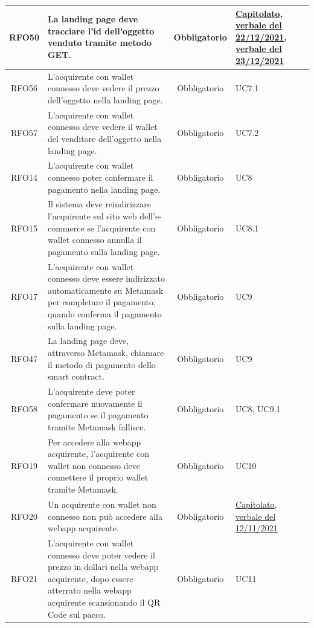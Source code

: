\documentclass[a4paper, 12pt]{article}
\begin{document}
\begin{longtable}{|c|p{7cm}|c|p{4cm}|}
\hline
RFO50 & La landing page deve tracciare l'id dell'oggetto venduto tramite metodo GET. & Obbligatorio & \underline{\href{https://www.math.unipd.it/~tullio/IS-1/2021/Progetto/C2.pdf}{Capitolato}}, \underline{\href{https://github.com/iota97/WinningSoftwareSolution/blob/main/public/esterni/verbali/2021_12_22_E.pdf}{verbale del 22/12/2021}}, \underline{\href{https://github.com/iota97/WinningSoftwareSolution/blob/main/public/interni/verbali/2021_12_23_I.pdf}{verbale del 23/12/2021}} \\
\hline
RFO56 & L'acquirente con wallet connesso deve vedere il prezzo dell'oggetto nella landing page. & Obbligatorio & UC7.1 \\
\hline
RFO57 & L'acquirente con wallet connesso deve vedere il wallet del venditore dell'oggetto nella landing page. & Obbligatorio & UC7.2 \\
\hline
RFO14 & L'acquirente con wallet connesso poter confermare il pagamento nella landing page. & Obbligatorio & UC8 \\
\hline
RFO15 & Il sistema deve reindirizzare l'acquirente sul sito web dell'e-commerce se l'acquirente con wallet connesso annulla il pagamento sulla landing page. & Obbligatorio & UC8.1 \\
\hline
RFO17 & L'acquirente con wallet connesso deve essere indirizzato automaticamente su Metamask per completare il pagamento, quando conferma il pagamento sulla landing page. & Obbligatorio & UC9 \\
\hline
RFO47 & La landing page deve, attraverso Metamask, chiamare il metodo di pagamento dello smart contract. & Obbligatorio & UC9 \\
\hline
RFO58 & L'acquirente deve poter confermare nuovamente il pagamento se il pagamento tramite Metamask fallisce. & Obbligatorio & UC8, UC9.1 \\
\hline
RFO19 & Per accedere alla webapp acquirente, l'acquirente con wallet non connesso deve connettere il proprio wallet tramite Metamask. & Obbligatorio & UC10 \\
\hline
RFO20 & Un acquirente con wallet non connesso non può accedere alla webapp acquirente. & Obbligatorio & \underline{\href{https://www.math.unipd.it/~tullio/IS-1/2021/Progetto/C2.pdf}{Capitolato}}, \underline{\href{https://github.com/iota97/WinningSoftwareSolution/blob/main/public/interni/verbali/2021_11_12_I.pdf}{verbale del 12/11/2021}} \\
\hline
RFO21 & L'acquirente con wallet connesso deve poter vedere il prezzo in dollari nella webapp acquirente, dopo essere atterrato nella webapp acquirente scansionando il QR Code sul pacco. & Obbligatorio & UC11 \\

\end{longtable}
\end{document}
